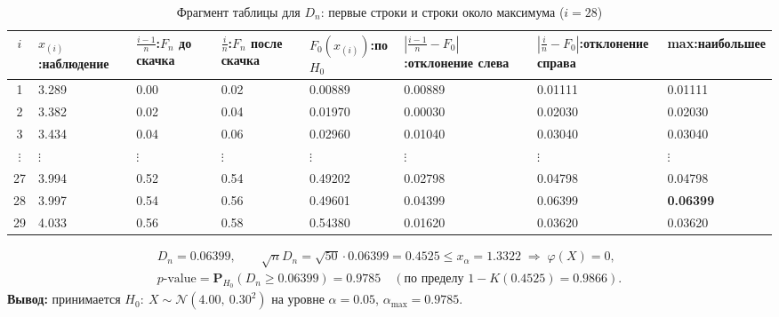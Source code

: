 \documentclass[12pt]{spbstu-task}
\renewcommand{\Prob}{\mathbf{P}}
\begin{document}
\begin{table}[H]
  \caption{Фрагмент таблицы для \(D_n\): первые строки и строки около максимума (\(i = 28\))}
  \centering
  \small
  \setlength{\tabcolsep}{2pt}
  \begin{tabularx}{\textwidth}{c*{7}{Y}}
    \toprule
    \(i\) & \(x_{(i)}\):\newline наблюдение & \(\frac{i - 1}{n}\):\newline \(F_n\) до скачка
    & \(\frac{i}{n}\):\newline \(F_n\) после скачка & \(F_0(x_{(i)})\):\newline по \(H_0\)
    & \(\left|\frac{i - 1}{n} - F_0\right|\):\newline отклонение слева
    & \(\left|\frac{i}{n} - F_0\right|\):\newline отклонение справа & max:\newline наибольшее \\
     & 3.289 & 0.00 & 0.02 & 0.00889 & 0.00889 & 0.01111 & 0.01111 \\
    2 & 3.382 & 0.02 & 0.04 & 0.01970 & 0.00030 & 0.02030 & 0.02030 \\
    3 & 3.434 & 0.04 & 0.06 & 0.02960 & 0.01040 & 0.03040 & 0.03040 \\
    \(\vdots\) & \(\vdots\) & \(\vdots\) & \(\vdots\) & \(\vdots\) & \(\vdots\) & \(\vdots\) & \(\vdots\) \\
    27 & 3.994 & 0.52 & 0.54 & 0.49202 & 0.02798 & 0.04798 & 0.04798 \\
    28 & 3.997 & 0.54 & 0.56 & 0.49601 & 0.04399 & 0.06399 & \textbf{0.06399} \\
    29 & 4.033 & 0.56 & 0.58 & 0.54380 & 0.01620 & 0.03620 & 0.03620 \\
    \bottomrule
  \end{tabularx}
\end{table}

\begin{gather*}
  D_n = 0.06399,\qquad \sqrt{n}D_n = \sqrt{50}\cdot 0.06399 = 0.4525 \le x_\alpha = 1.3322
  \;\Rightarrow\; \varphi(X) = 0,\\
  p\text{-value} = \Prob_{H_0}\left(D_n \ge 0.06399\right) = 0.9785\quad
  (\text{по пределу } 1 - K(0.4525) = 0.9866).
\end{gather*}
\noindent\textbf{Вывод:} принимается \(H_0:\ X \sim \mathcal{N}(4.00,\ 0.30^2)\) на уровне \(\alpha = 0.05\), \(\alpha_{\max} = 0.9785\).

\end{document}
